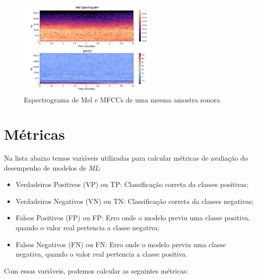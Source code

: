 \begin{figure}[]
\centering
\includegraphics[width=0.6\textwidth]{img/melspec-vs-mfcc.PNG}
\caption{\label{fig:melspecvsmfcc}Espectrograma de Mel e \acrshort{MFCC}s de uma mesma amostra sonora}
\author{Fonte: Imagem adaptada de~\cite{64}}
\end{figure}

\section{Métricas}\label{sec:metricas}

Na lista abaixo temos variáveis utilizadas para calcular métricas de avaliação do desempenho de modelos de \textit{ML}:

\begin{itemize}
    \item Verdadeiros Positivos (VP) ou \acrlong{TP}: Classificação correta da classes positivas;
    \item Verdadeiros Negativos (VN) ou \acrlong{TN}: Classificação correta da classes negativas;
    \item Falsos Positivos (FP) ou \acrlong{FP}: Erro onde o modelo previu uma classe positiva, quando o valor real pertencia a classe negativa;
    \item Falsos Negativos (FN) ou \acrlong{FN}: Erro onde o modelo previu uma classe negativa, quando o valor real pertencia a classe positiva.
\end{itemize}

Com essas variáveis, podemos calcular as seguintes métricas:

